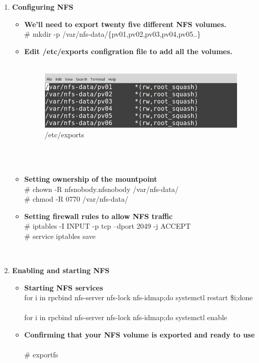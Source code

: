 \documentclass[11pt]{report}
\begin{document}
\begin{enumerate}
		\item \textbf{Configuring NFS}
		\ \\
		\begin{itemize}
			\item \textbf{We'll need to export twenty five different NFS volumes.}
			\ \\
			\# mkdir -p /var/nfs-data/\{pv01,pv02,pv03,pv04,pv05..\}
			
			\item \textbf{Edit /etc/exports configration file to add all the volumes.}
			\ \\
			\ \\
	\begin{figure}[h!]
    	\begin{center}
    	   		\includegraphics[scale=0.5]{pvolume.png}
    		\caption{/etc/exports}
    	  \end{center}
	  
	\end{figure}
			\ \\
			\ \\
			\item \textbf{Setting ownership of the mountpoint}
			\ \\
			\# chown -R nfsnobody.nfsnobody /var/nfs-data/
			\ \\
			\# chmod -R 0770 /var/nfs-data/
			\ \\
			\item \textbf{Setting firewall rules to allow NFS traffic}
			\ \\
			\# iptables -I INPUT -p tcp --dport 2049 -j ACCEPT
			\ \\
			\# service iptables save
			
		\end{itemize} 
		\ \\
		\item \textbf{Enabling and starting NFS}
		\begin{itemize}
			\item \textbf{Starting NFS services}
			\ \\
			for i in rpcbind nfs-server nfs-lock nfs-idmap;do systemctl restart \$i;done
			\ \\
			for i in rpcbind nfs-server nfs-lock nfs-idmap;do systemctl enable
			\item \textbf{Confirming that your NFS volume is exported and ready to use}
			\ \\
			\# exportfs
			

\end{itemize}
\end{enumerate}
\end{document}
